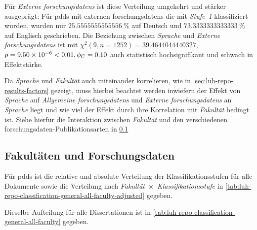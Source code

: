 Für \textit{Externe \glspl{forschungsdaten}} ist diese Verteilung umgekehrt und stärker ausgeprägt:
Für \glspl{pdd} mit externen \glspl{forschungsdaten} die mit \textit{Stufe~1} klassifiziert wurden, wurden nur $\SI[round-mode=places,round-precision=2]{25,5555555555556}{\percent}$ auf Deutsch und $\SI[round-mode=places,round-precision=2]{73,3333333333333}{\percent}$ auf Englisch geschrieben.
Die Beziehung zwischen \textit{Sprache} und \textit{Externe \glspl{forschungsdaten}} ist mit $\chi^2 (\num{9}, n=\num{1252}) = \num[round-mode=places,round-precision=2]{39.4644044440327}$, $p = \num[round-mode=places,round-precision=2]{9.49823708731411E-06}<\num{0.01},\phi_C=\num[round-mode=places,round-precision=2]{0.102503804500984}$ auch statistisch hochsignifikant und schwach in Effektstärke.

Da \textit{Sprache} und \textit{Fakultät} auch miteinander korrelieren, wie in \cref{sec:luh-repo-results-factors} gezeigt, muss hierbei beachtet werden inwiefern der Effekt von \textit{Sprache} auf \textit{Allgemeine \glspl{forschungsdaten}} und \textit{Externe \glspl{forschungsdaten}} an \textit{Sprache} liegt und wie viel der Effekt durch ihre Korrelation mit \textit{Fakultät} bedingt ist.
Siehe hierfür die Interaktion zwischen \textit{Fakultät} und den verschiedenen \gls{forschungsdaten}-Publikationsarten in \cref{sec:luh-repo-results-faculties}

\subsection{Fakultäten und Forschungsdaten}\label{sec:luh-repo-results-faculties}
Für \glspl{pdd} ist die relative und absolute Verteilung der Klassifikationsstufen für alle Dokumente sowie die Verteilung nach \textit{Fakultät}~$\times$~\textit{Klassifikationsstufe} in \cref{tab:luh-repo-classification-general-all-faculty-adjusted} gegeben.
\begin{table}[!htbp]
	\caption{\gls{forschungsdaten}-Klassifizierung der \glspl{pdd} aus der Stichprobe nach \textit{Fakultät}~$\times$~\textit{Klassifikationsstufe} aufgegliedert.
    Angabe relativ zu der respektiven Gesamtanzahl für \textit{Fakultät}.
    Absolute Werte in Klammern angegeben.}
    
    \label{tab:luh-repo-classification-general-all-faculty-adjusted}
\end{table}
Dieselbe Aufteilung für alle Dissertationen ist in \cref{tab:luh-repo-classification-general-all-faculty} gegeben.

